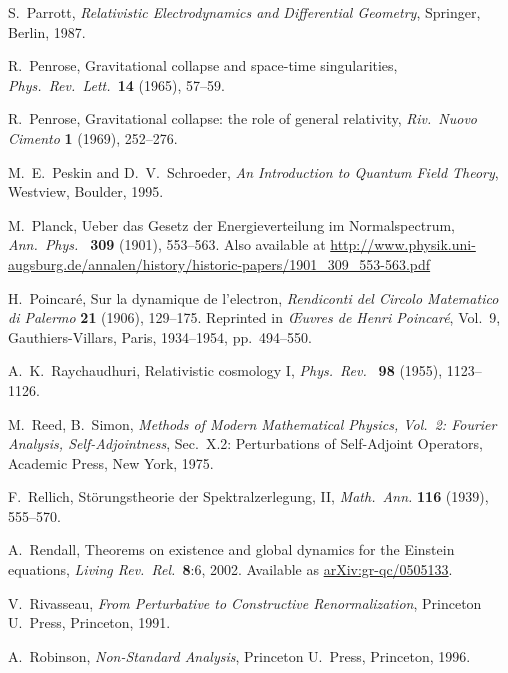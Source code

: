 \documentclass[12pt]{article}
\begin{document}
\begin{thebibliography}{10}
 S.\ Parrott, \textsl{Relativistic Electrodynamics and Differential Geometry}, Springer, Berlin, 1987.

 R.\ Penrose, Gravitational collapse and space-time singularities, \textsl{Phys.\ Rev.\ Lett.\ }\textbf{14} (1965), 57--59.

  R.\ Penrose, Gravitational collapse: the role of general relativity, \textsl{Riv.\ Nuovo Cimento} \textbf{1} (1969), 252--276.

 M.\ E.\ Peskin and D.\ V.\ Schroeder, \textsl{An Introduction
to Quantum Field Theory}, Westview, Boulder, 1995.

 M.\ Planck, Ueber das Gesetz der Energieverteilung im Normalspectrum, \textsl{Ann.\ Phys.\ } \textbf{309} (1901), 553--563.  Also available at \href{http://www.physik.uni-augsburg.de/annalen/history/historic-papers/1901_309_553-563.pdf}{http://www.physik.uni-}       
 \href{http://www.physik.uni-augsburg.de/annalen/history/historic-papers/1901_309_553-563.pdf}{augsburg.de/annalen/history/historic-papers/1901\_309\_553-563.pdf}

 H.\ Poincar\'e, Sur la dynamique de l'electron, \textsl{Rendiconti del Circolo Matematico di Palermo} {\bf 21} (1906), 129--175.  Reprinted in \textsl{\OE uvres de Henri Poincar\'e}, Vol.\ 9, Gauthiers-Villars, Paris, 1934--1954, pp.\ 494--550.

 A.\ K.\ Raychaudhuri, Relativistic cosmology I, \textsl{Phys.\ Rev.\ } \textbf{98} (1955), 1123--1126.

 M.\ Reed, B.\ Simon, \textsl{Methods of Modern Mathematical Physics, Vol.\ 2: Fourier Analysis, Self-Adjointness}, Sec.\ X.2: Perturbations of Self-Adjoint Operators, Academic Press, New York, 1975.

 F.\ Rellich, St\"orungstheorie der Spektralzerlegung, II, \textit{Math.\ Ann.} {\bf 116} (1939), 555--570. 

 A.\ Rendall, Theorems on existence and global dynamics for the Einstein equations, \textsl{Living Rev.\ Rel.\ }\textbf{8}:6, 2002.  Available as \href{http://arxiv.org/abs/gr-qc/0505133}{arXiv:gr-qc/0505133}.

 V.\ Rivasseau, \textsl{From Perturbative to Constructive Renormalization}, Princeton U.\ Press, Princeton, 1991.

 A.\ Robinson, \textsl{Non-Standard Analysis}, Princeton U.\ Press, Princeton, 1996.


\end{thebibliography}
\end{document}

